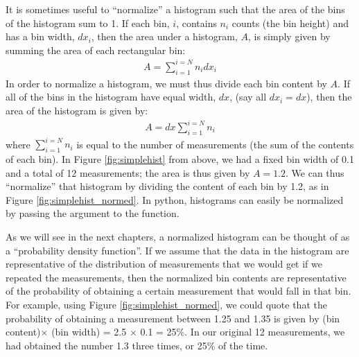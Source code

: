It is sometimes useful to ``normalize'' a histogram such that the area of the bins of the histogram sum to 1. If each bin, $i$, contains $n_i$ counts (the bin height) and has a bin width, $dx_i$, then the area under a histogram, $A$, is simply given by summing the area of each rectangular bin:
\begin{align}
A = \sum_{i=1}^{i=N}n_idx_i
\end{align}
In order to normalize a histogram, we must thus divide each bin content by $A$. If all of the bins in the histogram have equal width, $dx$, (say all $dx_i=dx$), then the area of the histogram is given by:
\begin{align}
A = dx\sum_{i=1}^{i=N}n_i
\end{align}
where $\sum_{i=1}^{i=N}n_i$ is equal to the number of measurements (the sum of the contents of each bin). In Figure \ref{fig:simplehist} from above, we had a fixed bin width of 0.1 and a total of 12 measurements; the area is thus given by $A=1.2$. We can thus ``normalize'' that histogram by dividing the content of each bin by 1.2, as in Figure \ref{fig:simplehist_normed}. In python, histograms can easily be normalized by passing the argument  to the  function. 


As we will see in the next chapters, a normalized histogram can be thought of as a ``probability density function''. If we assume that the data in the histogram are representative of the distribution of measurements that we would get if we repeated the measurements, then the normalized bin contents are representative of the probability of obtaining a certain measurement that would fall in that bin. For example, using Figure \ref{fig:simplehist_normed}, we could quote that the probability of obtaining a measurement between 1.25 and 1.35 is given by (bin content)$\times$ (bin width) = 2.5 $\times$ 0.1 = 25\%. In our original 12 measurements, we had obtained the number 1.3 three times, or 25\% of the time.

